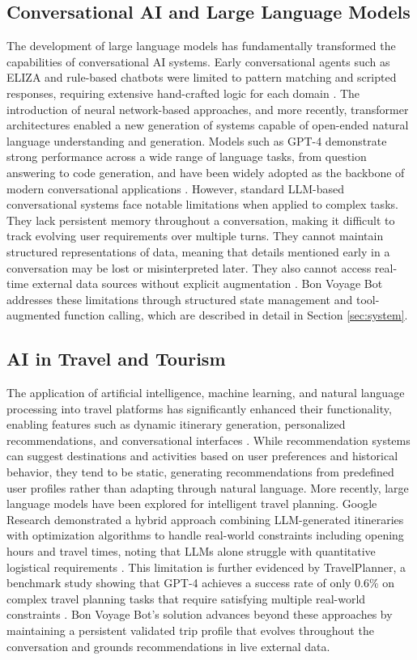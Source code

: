 \documentclass{article}
\begin{document}
\subsection{Conversational AI and Large Language Models}
The development of large language models has fundamentally transformed the capabilities of conversational AI systems. Early conversational agents such as ELIZA and rule-based chatbots were limited to pattern matching and scripted responses, requiring extensive hand-crafted logic for each domain \citep{wang2023survey}. The introduction of neural network-based approaches, and more recently, transformer architectures enabled a new generation of systems capable of open-ended natural language understanding and generation. Models such as GPT-4 demonstrate strong performance across a wide range of language tasks, from question answering to code generation, and have been widely adopted as the backbone of modern conversational applications \citep{openai2023gpt4}. However, standard LLM-based conversational systems face notable limitations when applied to complex tasks. They lack persistent memory throughout a conversation, making it difficult to track evolving user requirements over multiple turns. They cannot maintain structured representations of data, meaning that details mentioned early in a conversation may be lost or misinterpreted later. They also cannot access real-time external data sources without explicit augmentation \citep{schick2023toolformer}. Bon Voyage Bot addresses these limitations through structured state management and tool-augmented function calling, which are described in detail in Section \ref{sec:system}.

\subsection{AI in Travel and Tourism}
The application of artificial intelligence, machine learning, and natural language processing into travel platforms has significantly enhanced their functionality, enabling features such as dynamic itinerary generation, personalized recommendations, and conversational interfaces \citep{shivakumar2025}. While recommendation systems can suggest destinations and activities based on user preferences and historical behavior, they tend to be static, generating recommendations from predefined user profiles rather than adapting through natural language. 
More recently, large language models have been explored for intelligent travel planning. Google Research demonstrated a hybrid approach combining LLM-generated itineraries with optimization algorithms to handle real-world constraints including opening hours and travel times, noting that LLMs alone struggle with quantitative logistical requirements \citep{google2024tripplanning}. This limitation is further evidenced by TravelPlanner, a benchmark study showing that GPT-4 achieves a success rate of only 0.6\% on complex travel planning tasks that require satisfying multiple real-world constraints \citep{xie2024travelplanner}. Bon Voyage Bot's solution advances beyond these approaches by maintaining a persistent validated trip profile that evolves throughout the conversation and grounds recommendations in live external data. 
\end{document}
